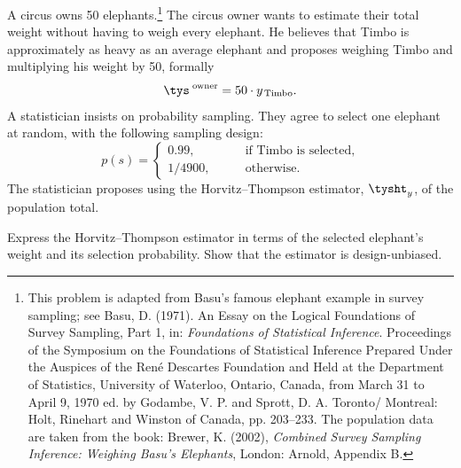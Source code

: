 




\begin{Problem}\label{problem:elephants}
    A circus owns 50 elephants.\footnote{This problem is adapted from Basu's
        famous elephant example in survey sampling; see Basu, D.
        (1971). An Essay on the Logical Foundations of Survey Sampling, Part 1,
        in: \emph{Foundations of Statistical Inference}. Proceedings of the
        Symposium on the Foundations of Statistical Inference Prepared Under
        the Auspices of the René Descartes Foundation and Held at the
        Department of Statistics, University of Waterloo, Ontario, Canada, from
        March 31 to April 9, 1970 ed. by Godambe, V. P. and Sprott, D. A.
        Toronto/ Montreal: Holt, Rinehart and Winston of Canada, pp. 203--233.
        The population data are taken from the book: Brewer, K. (2002),
        \emph{Combined Survey Sampling Inference: Weighing Basu's Elephants},
        London: Arnold, Appendix B.} The circus owner wants to estimate their
    total weight without having to weigh every elephant. He believes that Timbo
    is approximately as heavy as an average elephant and proposes weighing
    Timbo and multiplying his weight by 50, formally
    \begin{equation*}
        \tys^{\;\text{owner}} = 50 \cdot y_{\,\text{Timbo}}.
    \end{equation*}
    A statistician insists on probability sampling. They agree to select
    one elephant at random, with the following sampling design:
    \begin{equation*}
        p(s) = \begin{cases}
                0.99, & \qquad \text{if Timbo is selected},\\
                1/4900, & \qquad \text{otherwise}.
            \end{cases}
    \end{equation*}
    The statistician proposes using the Horvitz–Thompson estimator, $\tysht_y$,
    of the population total.

\begin{Subtask}
    \item Express the Horvitz–Thompson estimator in terms of the selected
        elephant's weight and its selection probability. Show that the
        estimator is design-unbiased.


\end{Subtask}
\end{Problem}
